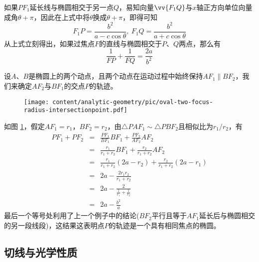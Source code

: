 \begin{example}
 如果$PF_1$延长线与椭圆相交于另一点$Q$，易知向量$\vv{F_1Q}$与$x$轴正方向单位向量成角$\theta+\pi$，因此在上式中将$\theta$换成$\theta+\pi$，即得可知
\begin{equation}
  \label{eq:oval-focal-radius-theta-2}
  F_1P=\frac{b^2}{a-c\cos{\theta}}, \  F_1Q=\frac{b^2}{a+c\cos{\theta}}
\end{equation}
从上式立刻得出，如果过焦点$F$的直线与椭圆相交于$P$、$Q$两点，那么有
\begin{equation}
  \label{eq:oval-focal-line-split}
  \frac{1}{FP}+\frac{1}{FQ}=\frac{2a}{b^2}
\end{equation}
\end{example}

\begin{example}
设$A$、$B$是椭圆上的两个动点，且两个动点在运动过程中始终保持$AF_1 \parallel BF_2$，我们来确定$AF_2$与$BF_1$的交点$P$的轨迹。

\begin{figure}[htbp]
  \centering
\texttt{[image: content/analytic-geometry/pic/oval-two-focus-radius-intersectionpoint.pdf]}
\caption{}
\label{fig:oval-two-focus-radius-intersectionpoint}
\end{figure}

如图 \ref{fig:oval-two-focus-radius-intersectionpoint}，假定$AF_1=r_1$，$BF_2=r_2$，由$\triangle PAF_1 \sim \triangle PBF_2$且相似比为$r_1/r_2$，有
\begin{eqnarray*}
  PF_1 + PF_2 & = & \frac{PF_1}{BF_1}BF_1 + \frac{PF_2}{AF_2}AF_2 \\
              & = & \frac{r_1}{r_1+r_2}BF_1 + \frac{r_2}{r_1+r_2}AF_2 \\
              & = & \frac{r_1}{r_1+r_2}(2a-r_2) + \frac{r_2}{r_1+r_2}(2a-r_1) \\
              & = & 2a - \frac{2r_1r_2}{r_1+r_2} \\
              & = & 2a - \frac{2}{\frac{1}{r_1}+\frac{1}{r_2}} \\
  & = & 2a - \frac{b^2}{a}
\end{eqnarray*}
最后一个等号处利用了上一个例子中的结论($BF_2$平行且等于$AF_1$延长后与椭圆相交的另一段线段)，这结果这表明点$P$的轨迹是一个具有相同焦点的椭圆。
\end{example}
\subsection{切线与光学性质}
\label{sec:oval-tangent}

